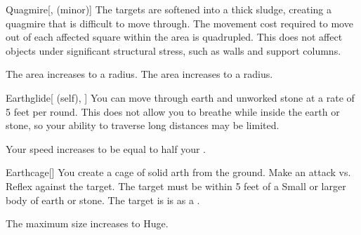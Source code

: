 \lowercase{\hypertarget{spell:Quagmire}{}}\label{spell:Quagmire}
\begin{freeability}[Rank 4]{\hypertarget{spell:Quagmire}{Quagmire}}[,  (minor)]
The targets are softened into a thick sludge, creating a quagmire that is difficult to move through.
The movement cost required to move out of each affected square within the area is quadrupled.
This does not affect objects under significant structural stress, such as walls and support columns.

\rankline
{} The area increases to a \arealarge radius.
 The area increases to a \areahuge radius.

\end{freeability}
\vspace{0.25em}



\lowercase{\hypertarget{spell:Earthglide}{}}\label{spell:Earthglide}
\begin{attuneability}[Rank 5]{\hypertarget{spell:Earthglide}{Earthglide}}[ (self), ]
You can move through earth and unworked stone at a rate of 5 feet per round.
This does not allow you to breathe while inside the earth or stone, so your ability to traverse long distances may be limited.

\rankline
{} Your speed increases to be equal to half your .

\end{attuneability}
\vspace{0.25em}



\lowercase{\hypertarget{spell:Earthcage}{}}\label{spell:Earthcage}
\begin{freeability}[Rank 6]{\hypertarget{spell:Earthcage}{Earthcage}}[]
You create a cage of solid arth from the ground.
Make an attack vs. Reflex against the target.
The target must be within 5 feet of a Small or larger body of earth or stone.
\hit The target is is  as a .

\rankline
{} The maximum size increases to Huge.

\end{freeability}
\vspace{0.25em}



